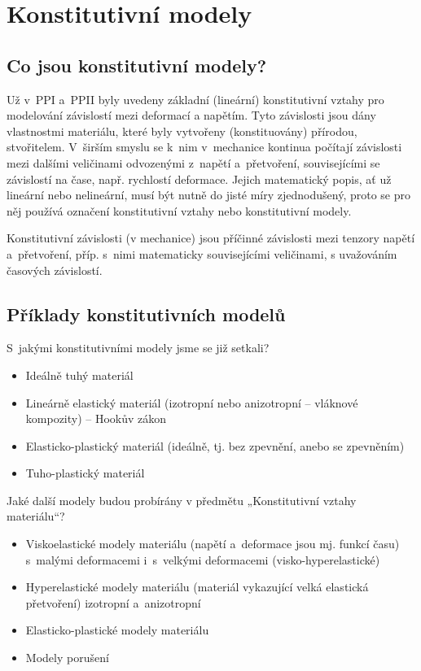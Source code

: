 
\section{Konstitutivní modely}

\subsection{Co jsou konstitutivní modely?}
Už v~PPI a~PPII byly uvedeny základní (lineární) konstitutivní vztahy pro modelování závislostí mezi deformací a napětím.
Tyto závislosti jsou dány vlastnostmi materiálu, které byly vytvořeny (konstituovány) přírodou, stvořitelem.
V~širším smyslu se k~nim v~mechanice kontinua počítají závislosti mezi dalšími veličinami odvozenými z~napětí a~přetvoření, souvisejícími se závislostí na čase, např. rychlostí deformace.
Jejich matematický popis, ať už lineární nebo nelineární, musí být nutně do jisté míry zjednodušený, proto se pro něj používá označení konstitutivní vztahy nebo konstitutivní modely.


Konstitutivní závislosti (v mechanice) jsou příčinné závislosti mezi tenzory napětí a~přetvoření, příp. s~nimi matematicky souvisejícími veličinami, s uvažováním časových závislostí.

\subsection{Příklady konstitutivních modelů}

S~jakými konstitutivními modely jsme se již setkali? 
\begin{itemize}
	\item Ideálně tuhý materiál
	\item Lineárně elastický materiál (izotropní nebo anizotropní -- vláknové kompozity) -- Hookův zákon
	\item Elasticko-plastický materiál (ideálně, tj. bez zpevnění, anebo se zpevněním)
	\item Tuho-plastický materiál
\end{itemize}

Jaké další modely budou probírány v předmětu „Konstitutivní vztahy materiálu“?
\begin{itemize}
	\item Viskoelastické modely materiálu (napětí a~deformace jsou mj. funkcí času) s~malými deformacemi i~s~velkými deformacemi (visko-hyperelastické)
	\item Hyperelastické modely materiálu  (materiál vykazující velká elastická přetvoření) izotropní a~anizotropní
	\item Elasticko-plastické modely materiálu
	\item Modely porušení
\end{itemize}

